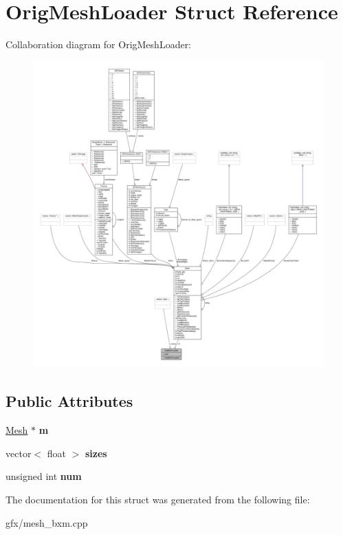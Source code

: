 \hypertarget{structOrigMeshLoader}{}\section{Orig\+Mesh\+Loader Struct Reference}
\label{structOrigMeshLoader}


Collaboration diagram for Orig\+Mesh\+Loader\+:
\nopagebreak
\begin{figure}[H]
\begin{center}
\leavevmode
\includegraphics[width=350pt]{d6/d24/structOrigMeshLoader__coll__graph}
\end{center}
\end{figure}
\subsection*{Public Attributes}
\begin{DoxyCompactItemize}
\item 
\hyperlink{classMesh}{Mesh} $\ast$ {\bfseries m}\hypertarget{structOrigMeshLoader_aa074e4e60734226084a5af28525c6bae}{}\label{structOrigMeshLoader_aa074e4e60734226084a5af28525c6bae}

\item 
vector$<$ float $>$ {\bfseries sizes}\hypertarget{structOrigMeshLoader_a5a3a081b5d57654ef5a6243ed7027e06}{}\label{structOrigMeshLoader_a5a3a081b5d57654ef5a6243ed7027e06}

\item 
unsigned int {\bfseries num}\hypertarget{structOrigMeshLoader_aae153dece574d2855b7bfc2a98a83084}{}\label{structOrigMeshLoader_aae153dece574d2855b7bfc2a98a83084}

\end{DoxyCompactItemize}


The documentation for this struct was generated from the following file\+:\begin{DoxyCompactItemize}
\item 
gfx/mesh\+\_\+bxm.\+cpp\end{DoxyCompactItemize}
